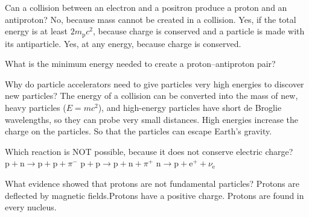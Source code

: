 \begin{quizq}{}
Can a collision between an electron and a positron produce a proton and an antiproton?
  {No, because mass cannot be created in a collision.}
  {Yes, if the total energy is at least $2m_\mathrm{p}c^2$, because charge is conserved and a particle is
   made with its antiparticle.}
  {Yes, at any energy, because charge is conserved.}
\end{quizq}

\begin{quizq}{}
What is the minimum energy needed to create a proton--antiproton pair?
\end{quizq}

\begin{quizq}{}
Why do particle accelerators need to give particles very high energies to discover new particles?
  {The energy of a collision can be converted into the mass of new, heavy particles ($E = mc^2$), and
   high-energy particles have short de Broglie wavelengths, so they can probe very small distances.}
  {High energies increase the charge on the particles.}
  {So that the particles can escape Earth's gravity.}
\end{quizq}

\begin{quizq}{}
Which reaction is NOT possible, because it does not conserve electric charge?
  {$\mathrm{p} + \mathrm{n} \rightarrow \mathrm{p} + \mathrm{p} + \pi^-$}
  {$\mathrm{p} + \mathrm{p} \rightarrow \mathrm{p} + \mathrm{n} + \pi^+$}
  {$\mathrm{n} \rightarrow \mathrm{p} + \mathrm{e}^+ + \nu_\mathrm{e}$}
\end{quizq}

\begin{quizq}{}
What evidence showed that protons are not fundamental particles?
  {Protons are deflected by magnetic fields.}{Protons have a positive charge.}
  {Protons are found in every nucleus.}
\end{quizq}


